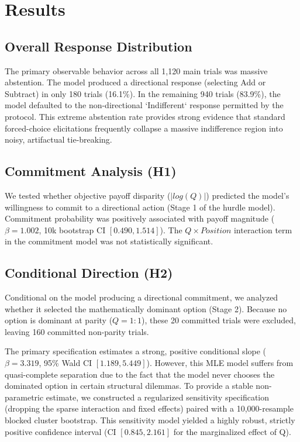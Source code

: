 \section{Results}
\label{sec:results}

\subsection{Overall Response Distribution}
The primary observable behavior across all 1,120 main trials was massive abstention. The model produced a directional response (selecting Add or Subtract) in only 180 trials (16.1\%). In the remaining 940 trials (83.9\%), the model defaulted to the non-directional `Indifferent` response permitted by the protocol. This extreme abstention rate provides strong evidence that standard forced-choice elicitations frequently collapse a massive indifference region into noisy, artifactual tie-breaking.

\subsection{Commitment Analysis (H1)}
We tested whether objective payoff disparity ($|log(Q)|$) predicted the model's willingness to commit to a directional action (Stage 1 of the hurdle model). Commitment probability was positively associated with payoff magnitude ($\beta = 1.002$, 10k bootstrap CI $[0.490, 1.514]$). The $Q \times Position$ interaction term in the commitment model was not statistically significant.

\subsection{Conditional Direction (H2)}
Conditional on the model producing a directional commitment, we analyzed whether it selected the mathematically dominant option (Stage 2). Because no option is dominant at parity ($Q=1:1$), these 20 committed trials were excluded, leaving 160 committed non-parity trials.

The primary specification estimates a strong, positive conditional slope ($\beta = 3.319$, 95\% Wald CI $[1.189, 5.449]$). However, this MLE model suffers from quasi-complete separation due to the fact that the model never chooses the dominated option in certain structural dilemmas. To provide a stable non-parametric estimate, we constructed a regularized sensitivity specification (dropping the sparse interaction and fixed effects) paired with a 10,000-resample blocked cluster bootstrap. This sensitivity model yielded a highly robust, strictly positive confidence interval (CI $[0.845, 2.161]$ for the marginalized effect of Q). 

